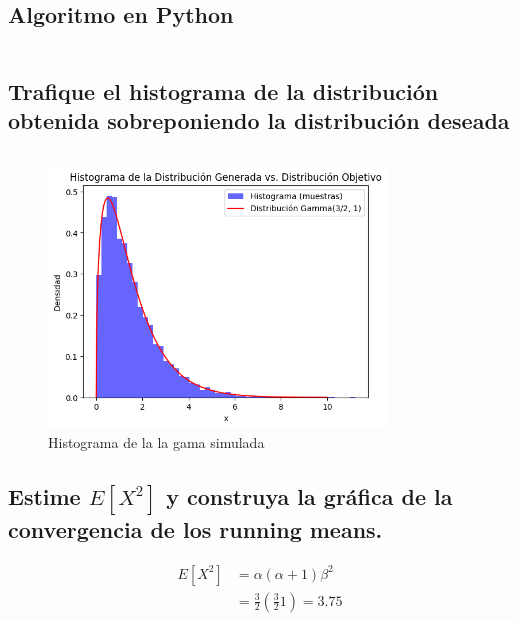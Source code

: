 \documentclass{article}
\begin{document}
\subsection{Algoritmo en Python}
\begin{pythonbox}
	\inputminted{python}{code/accept.py}
\end{pythonbox}

\subsection{Trafique el histograma de la distribución obtenida sobreponiendo la distribución deseada}
\begin{pythonbox}
	\inputminted{python}{code/accept_graph.py}
\end{pythonbox}
\begin{figure}[H]
	\centering
	\includegraphics[width=0.8\textwidth]{assets/gamma.png}
	\caption{Histograma de la la gama simulada}
\end{figure}


\subsection{Estime $E[X^2]$ y construya la gráfica de la convergencia de los running means.}

\[
	\begin{split}
		E[X^2] & = \alpha(\alpha + 1)\beta^2      \\
		       & = \frac{3}{2}(\frac{3}{2}1)=3.75
	\end{split}
\]
\begin{pythonbox}[title={The }]
	\inputminted{python}{code/test.py}
\end{pythonbox}
\end{document}
